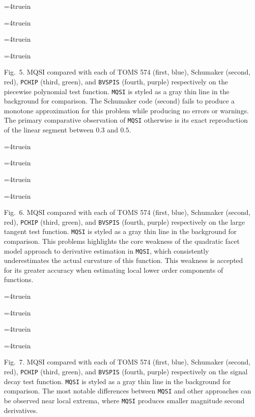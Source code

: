 \goodbreak

\topinsert
\centerline{\epsfxsize=4truein }
\centerline{\epsfxsize=4truein }
\centerline{\epsfxsize=4truein }
\centerline{\epsfxsize=4truein }
{\narrower\noindent\rmVIII Fig.\ 5.
{\ttVIII MQSI} compared with each of TOMS 574 (first, blue), Schumaker
(second, red), {\tt PCHIP} (third, green), and {\tt BVSPIS} (fourth, purple)
respectively on the {\itVIII piecewise polynomial} test function. {\tt MQSI}
is styled as a gray thin line in the background for comparison. The
Schumaker code (second) fails to produce a monotone approximation for
this problem while producing no errors or warnings. The primary
comparative observation of {\tt MQSI} otherwise is its exact reproduction of
the linear segment between $0.3$ and $0.5$.
\par}
\endinsert


\topinsert
\centerline{\epsfxsize=4truein }
\centerline{\epsfxsize=4truein }
\centerline{\epsfxsize=4truein }
\centerline{\epsfxsize=4truein }
{\narrower\noindent\rmVIII Fig.\ 6.
{\ttVIII MQSI} compared with each of TOMS 574 (first, blue), Schumaker
(second, red), {\tt PCHIP} (third, green), and {\tt BVSPIS} (fourth, purple)
respectively on the {\itVIII large tangent} test function. {\tt MQSI} is
styled as a gray thin line in the background for comparison. This
problems highlights the core weakness of the quadratic facet model
approach to derivative estimation in {\tt MQSI}, which consistently
underestimates the actual curvature of this function. This weakness is
accepted for its greater accuracy when estimating local lower order
components of functions.
\par}
\endinsert


\topinsert
\centerline{\epsfxsize=4truein }
\centerline{\epsfxsize=4truein }
\centerline{\epsfxsize=4truein }
\centerline{\epsfxsize=4truein }
{\narrower\noindent\rmVIII Fig.\ 7.
{\ttVIII MQSI} compared with each of TOMS 574 (first, blue), Schumaker
(second, red), {\tt PCHIP} (third, green), and {\tt BVSPIS} (fourth, purple)
respectively on the {\itVIII signal decay} test function. {\tt MQSI} is
styled as a gray thin line in the background for comparison. The most
notable differences between {\tt MQSI} and other approaches can be observed
near local extrema, where {\tt MQSI} produces smaller magnitude second
derivatives.
\par}
\endinsert


